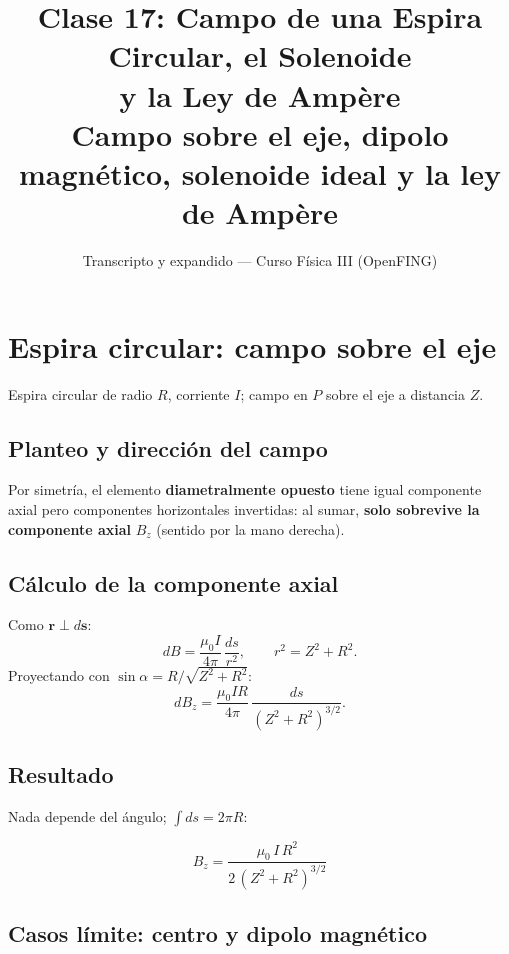 \documentclass[12pt,a4paper]{article}
\title{\textbf{Clase 17: Campo de una Espira Circular, el Solenoide \\
        y la Ley de Ampère}\\[0.3em]
        \large{Campo sobre el eje, dipolo magnético, solenoide ideal
              y la ley de Ampère}}
\author{Transcripto y expandido --- Curso Física III (OpenFING)}
\date{}
\begin{document}
\maketitle
\thispagestyle{empty}
\newpage

\tableofcontents
\newpage

\section{Espira circular: campo sobre el eje}

Espira circular de radio $R$, corriente $I$; campo en $P$ sobre el eje a
distancia $Z$.

\subsection{Planteo y dirección del campo}

Por simetría, el elemento \textbf{diametralmente opuesto} tiene igual
componente axial pero componentes horizontales invertidas: al sumar,
\textbf{solo sobrevive la componente axial} $B_z$ (sentido por la mano
derecha).

\subsection{Cálculo de la componente axial}

Como $\mathbf{r}\perp d\mathbf{s}$:
\[
dB = \frac{\mu_0 I}{4\pi}\,\frac{ds}{r^2}, \qquad r^2 = Z^2 + R^2.
\]
Proyectando con $\sin\alpha = R/\sqrt{Z^2+R^2}$:
\[
dB_z = \frac{\mu_0 I R}{4\pi}\,\frac{ds}{(Z^2+R^2)^{3/2}}.
\]



\subsection{Resultado}

Nada depende del ángulo; $\int ds = 2\pi R$:

\begin{keybox}
  \[
  \boxed{B_z = \frac{\mu_0\, I\, R^2}{2\,(Z^2+R^2)^{3/2}}}
  \]
\end{keybox}

\subsection{Casos límite: centro y dipolo magnético}
\end{document}
